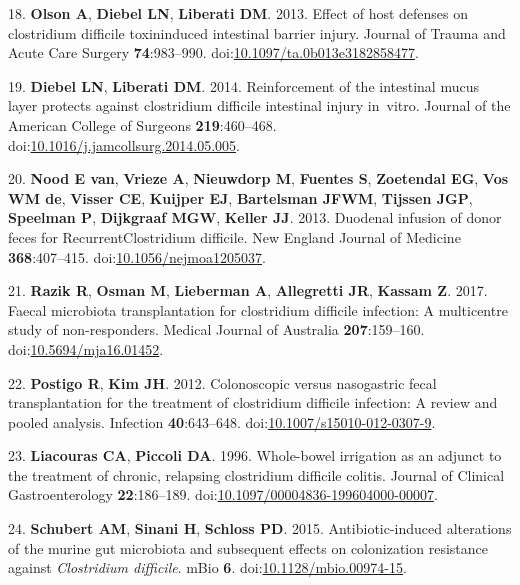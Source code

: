 \documentclass[
  11pt,
]{article}
\begin{document}
\leavevmode\hypertarget{ref-Olson2013}{}%
18. \textbf{Olson A}, \textbf{Diebel LN}, \textbf{Liberati DM}. 2013.
Effect of host defenses on clostridium difficile toxininduced intestinal
barrier injury. Journal of Trauma and Acute Care Surgery
\textbf{74}:983--990.
doi:\href{https://doi.org/10.1097/ta.0b013e3182858477}{10.1097/ta.0b013e3182858477}.

\leavevmode\hypertarget{ref-Diebel2014}{}%
19. \textbf{Diebel LN}, \textbf{Liberati DM}. 2014. Reinforcement of the
intestinal mucus layer protects against clostridium difficile intestinal
injury in~vitro. Journal of the American College of Surgeons
\textbf{219}:460--468.
doi:\href{https://doi.org/10.1016/j.jamcollsurg.2014.05.005}{10.1016/j.jamcollsurg.2014.05.005}.

\leavevmode\hypertarget{ref-vanNood2013}{}%
20. \textbf{Nood E van}, \textbf{Vrieze A}, \textbf{Nieuwdorp M},
\textbf{Fuentes S}, \textbf{Zoetendal EG}, \textbf{Vos WM de},
\textbf{Visser CE}, \textbf{Kuijper EJ}, \textbf{Bartelsman JFWM},
\textbf{Tijssen JGP}, \textbf{Speelman P}, \textbf{Dijkgraaf MGW},
\textbf{Keller JJ}. 2013. Duodenal infusion of donor feces for
RecurrentClostridium difficile. New England Journal of Medicine
\textbf{368}:407--415.
doi:\href{https://doi.org/10.1056/nejmoa1205037}{10.1056/nejmoa1205037}.

\leavevmode\hypertarget{ref-Razik2017}{}%
21. \textbf{Razik R}, \textbf{Osman M}, \textbf{Lieberman A},
\textbf{Allegretti JR}, \textbf{Kassam Z}. 2017. Faecal microbiota
transplantation for clostridium difficile infection: A multicentre study
of non-responders. Medical Journal of Australia \textbf{207}:159--160.
doi:\href{https://doi.org/10.5694/mja16.01452}{10.5694/mja16.01452}.

\leavevmode\hypertarget{ref-Postigo2012}{}%
22. \textbf{Postigo R}, \textbf{Kim JH}. 2012. Colonoscopic versus
nasogastric fecal transplantation for the treatment of clostridium
difficile infection: A review and pooled analysis. Infection
\textbf{40}:643--648.
doi:\href{https://doi.org/10.1007/s15010-012-0307-9}{10.1007/s15010-012-0307-9}.

\leavevmode\hypertarget{ref-Liacouras1996}{}%
23. \textbf{Liacouras CA}, \textbf{Piccoli DA}. 1996. Whole-bowel
irrigation as an adjunct to the treatment of chronic, relapsing
clostridium difficile colitis. Journal of Clinical Gastroenterology
\textbf{22}:186--189.
doi:\href{https://doi.org/10.1097/00004836-199604000-00007}{10.1097/00004836-199604000-00007}.

\leavevmode\hypertarget{ref-Schubert2015}{}%
24. \textbf{Schubert AM}, \textbf{Sinani H}, \textbf{Schloss PD}. 2015.
Antibiotic-induced alterations of the murine gut microbiota and
subsequent effects on colonization resistance against \emph{Clostridium
difficile}. mBio \textbf{6}.
doi:\href{https://doi.org/10.1128/mbio.00974-15}{10.1128/mbio.00974-15}.
\end{document}
